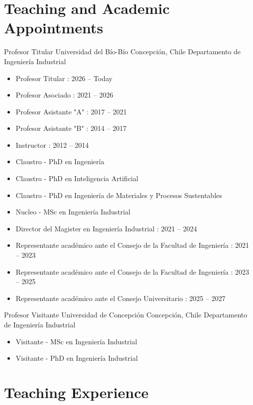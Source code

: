 \section{Teaching and Academic Appointments}

{Profesor Titular}
{Universidad del B\'io-B\'io}
{Concepci\'on, Chile}
{Departamento de Ingenier\'ia Industrial}
{\begin{itemize}
\item Profesor Titular       : 2026 -- Today
\item Profesor Asociado      : 2021 -- 2026
\item Profesor Asistante "A" : 2017 -- 2021
\item Profesor Asistante "B" : 2014 -- 2017
\item Instructor             : 2012 -- 2014
\item Claustro    - PhD en Ingenier\'ia
\item Claustro    - PhD en Inteligencia Artificial
\item Claustro    - PhD en Ingenier\'ia de Materiales y Procesos Sustentables
\item Nucleo      - MSc en Ingenier\'ia Industrial
\item Director del Magister en Ingenier\'ia Industrial                         : 2021 -- 2024
\item Representante acad\'emico ante el Consejo de la Facultad de Ingenier\'ia : 2021 -- 2023
\item Representante acad\'emico ante el Consejo de la Facultad de Ingenier\'ia : 2023 -- 2025
\item Representante acad\'emico ante el Consejo Universitario                  : 2025 -- 2027
\end{itemize}}

{Profesor Visitante}
{Universidad de Concepci\'on}
{Concepci\'on, Chile}
{Departamento de Ingenier\'ia Industrial}
{\begin{itemize}
\item Visitante - MSc en Ingenier\'ia Industrial
\item Visitante - PhD en Ingenier\'ia Industrial
\end{itemize}}

\section{Teaching Experience}


